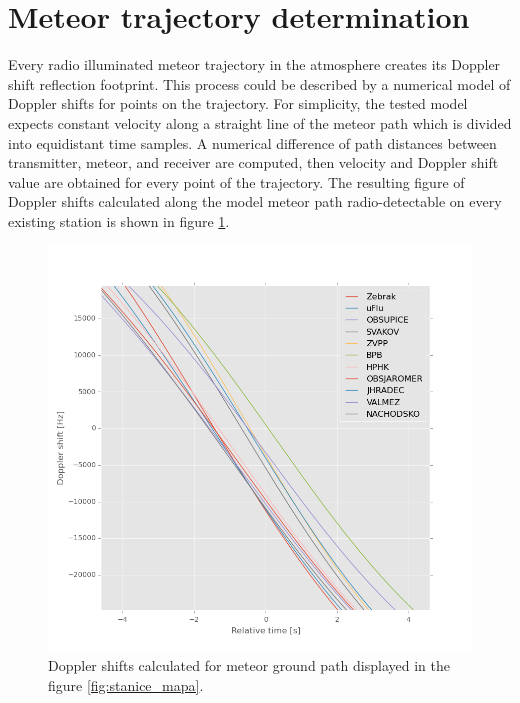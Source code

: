 \documentclass[twoside]{ctuthesis}
\theoremstyle{plain}
\theoremstyle{definition}
\theoremstyle{note}
\begin{document}
\section{Meteor trajectory determination}

Every radio illuminated meteor trajectory in the atmosphere creates its Doppler shift reflection footprint.  This process could be described by a numerical model of Doppler shifts for points on the trajectory. For simplicity, the tested model expects constant velocity along a straight line of the meteor path which is divided into equidistant time samples. A numerical difference of path distances between transmitter, meteor, and receiver are computed, then velocity and Doppler shift value are obtained for every point of the trajectory. 
The resulting figure of Doppler shifts calculated along the model meteor path radio-detectable on every existing station is shown in figure \ref{fig:dopplers}. 

\begin{figure}
 \begin{center}
 \includegraphics[width=\textwidth]{./img/Meteor_dopplers.png}
 \caption{Doppler shifts calculated for meteor ground path displayed in the figure \ref{fig:stanice_mapa}.}
  \label{fig:dopplers} 
 \end{center}
\end{figure}
\end{document}
